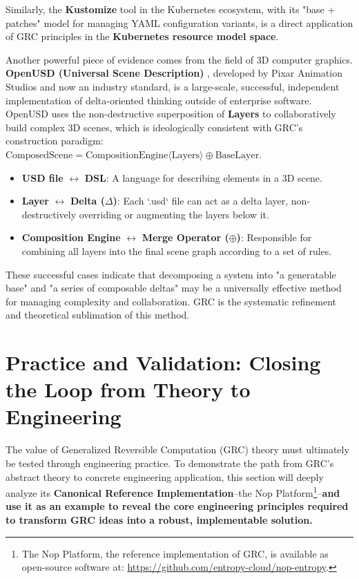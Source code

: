 \documentclass[11pt]{article}
\begin{document}
Similarly, the \textbf{Kustomize} tool in the Kubernetes ecosystem, with its "base + patches" model for managing YAML configuration variants, is a direct application of GRC principles in the \textbf{Kubernetes resource model space}.

Another powerful piece of evidence comes from the field of 3D computer graphics. \textbf{OpenUSD (Universal Scene Description)} \cite{pixar2016}, developed by Pixar Animation Studios and now an industry standard, is a large-scale, successful, independent implementation of delta-oriented thinking outside of enterprise software. OpenUSD uses the non-destructive superposition of \textbf{Layers} to collaboratively build complex 3D scenes, which is ideologically consistent with GRC's construction paradigm: $\text{ComposedScene} = \text{CompositionEngine}\langle\text{Layers}\rangle \oplus \text{BaseLayer}$.

\begin{itemize}
    \item \textbf{USD file} $\leftrightarrow$ \textbf{DSL}: A language for describing elements in a 3D scene.
    \item \textbf{Layer} $\leftrightarrow$ \textbf{Delta ($\Delta$)}: Each `.usd` file can act as a delta layer, non-destructively overriding or augmenting the layers below it.
    \item \textbf{Composition Engine} $\leftrightarrow$ \textbf{Merge Operator ($\oplus$)}: Responsible for combining all layers into the final scene graph according to a set of rules.
\end{itemize}

These successful cases indicate that decomposing a system into "a generatable base" and "a series of composable deltas" may be a universally effective method for managing complexity and collaboration. GRC is the systematic refinement and theoretical sublimation of this method.

\section{Practice and Validation: Closing the Loop from Theory to Engineering}

The value of Generalized Reversible Computation (GRC) theory must ultimately be tested through engineering practice. To demonstrate the path from GRC's abstract theory to concrete engineering application, this section will deeply analyze its \textbf{Canonical Reference Implementation}--the Nop Platform\footnote{The Nop Platform, the reference implementation of GRC, is available as open-source software at: \url{https://github.com/entropy-cloud/nop-entropy}.}--\textbf{and use it as an example to reveal the core engineering principles required to transform GRC ideas into a robust, implementable solution.}
\end{document}
